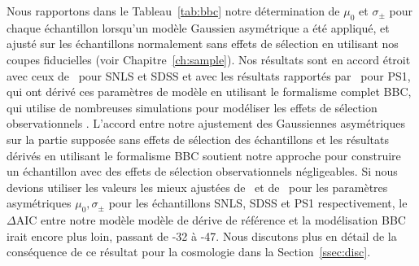 \documentclass[../main/main.tex]{subfiles}
\begin{document}
Nous rapportons dans le Tableau~\ref{tab:bbc} notre détermination de $\mu_0$ et
$\sigma_{\pm}$ pour chaque échantillon lorsqu'un modèle Gaussien asymétrique a
été appliqué, et ajusté sur les échantillons normalement sans effets de
sélection en utilisant nos coupes fiducielles (voir Chapitre~\ref{ch:sample}).
Nos résultats sont en accord étroit avec ceux de~\cite{scolnic2016} pour SNLS et
SDSS et avec les résultats rapportés par~\cite{scolnic2018} pour PS1, qui ont
dérivé ces paramètres de modèle en utilisant le formalisme complet BBC, qui
utilise de nombreuses simulations pour modéliser les effets de sélection
observationnels \citep[voir les détails par exemple Section~3 de][et le
Chapitre~\ref{ch:snana}]{kessler2017}. L'accord entre notre ajustement des
Gaussiennes asymétriques sur la partie supposée sans effets de sélection des
échantillons et les résultats dérivés en utilisant le formalisme BBC soutient
notre approche pour construire un échantillon avec des effets de sélection
observationnels négligeables. Si nous devions utiliser les valeurs les mieux
ajustées de~\cite{scolnic2016} et de~\cite{scolnic2018} pour les paramètres
asymétriques $\mu_0,\sigma_{\pm}$ pour les échantillons SNLS, SDSS et PS1
respectivement, le $\Delta$AIC entre notre modèle modèle de dérive de référence
et la modélisation BBC irait encore plus loin, passant de -32 à -47. Nous
discutons plus en détail de la conséquence de ce résultat pour la cosmologie
dans la Section~\ref{ssec:disc}.
\end{document}
